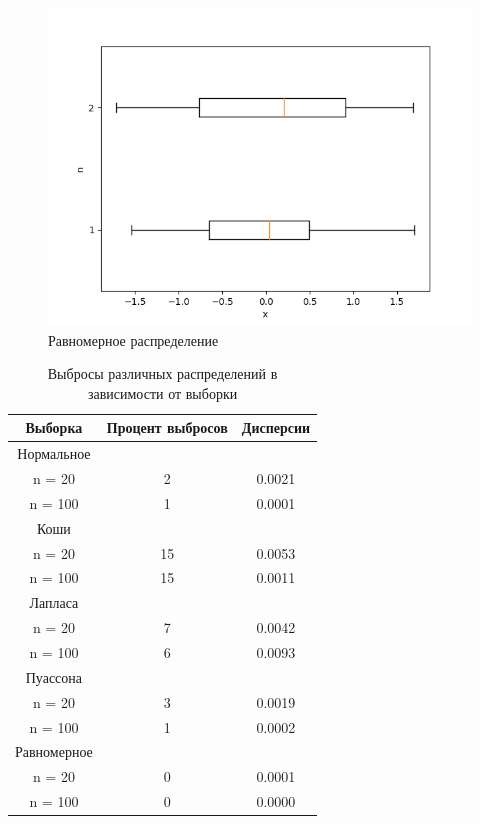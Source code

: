 \documentclass[a4]{article}
\begin{document}
\begin{center}
\begin{figure}[h]
					\includegraphics[width=\textwidth]{uniform.png}
					\caption[Равномерное распределение]{Равномерное распределение}
				\end{figure}
	
		\end{center}
		\newpage
		\begin{table}[h]
			
			\caption{Выбросы различных распределений в зависимости от выборки}
			\label{tab:my_label}
			\begin{center}
				\vspace{5mm}
				\begin{tabular}{|c|c|c|}
					\hline
					Выборка & Процент выбросов & Дисперсии\\
					\hline
					Нормальное	&\\
					\hline
					n = 20   & 	2  & 0.0021  \\
					\hline
					n = 100   &	1   & 0.0001 \\
					\hline
					Коши	&\\
					\hline
					n = 20   & 	15  & 0.0053  \\
					\hline
					n = 100  & 	15   & 0.0011 \\
					\hline
					Лапласа	&\\
					\hline
					n = 20    &	7   & 0.0042 \\
					\hline
					n = 100   &	6   & 0.0093 \\
					\hline
					Пуассона	&\\
					\hline
					n = 20   & 	3   & 0.0019 \\
					\hline
					n = 100  & 	1   & 0.0002 \\
					\hline
					Равномерное	&\\
					\hline
					n = 20    &	0   & 0.0001 \\
					\hline
					n = 100   &	0  & 0.0000 \\ 
					\hline
				\end{tabular}
				
			\end{center}
			
		\end{table}
		
\end{document}
